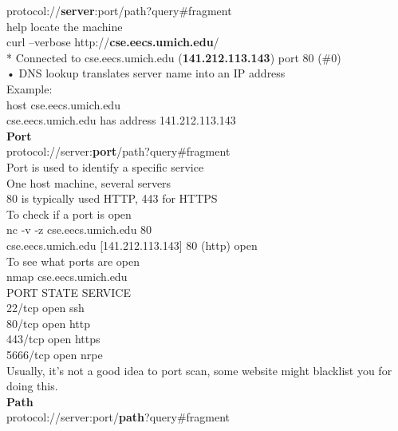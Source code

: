 \documentclass{article}
\begin{document}
protocol://\textbf{server}:port/path?query#fragment\\
help locate the machine\\
 curl --verbose http://\textbf{cse.eecs.umich.edu}/ \\
* Connected to cse.eecs.umich.edu (\textbf{141.212.113.143}) port 80 (\#0)\\
• DNS lookup translates server name into an IP address \\
Example: \\
host cse.eecs.umich.edu\\
cse.eecs.umich.edu has address 141.212.113.143 \\
\textbf{Port}\\
protocol://server:\textbf{port}/path?query#fragment\\
Port is used to identify a specific service\\
One host machine, several servers\\
80 is typically used HTTP, 443 for HTTPS\\
To check if a port is open\\
nc -v -z cse.eecs.umich.edu 80 \\
cse.eecs.umich.edu [141.212.113.143] 80 (http) open\\
To see what ports are open\\
nmap cse.eecs.umich.edu\\
PORT STATE SERVICE \\
22/tcp open ssh \\
80/tcp open http \\
443/tcp open https\\
5666/tcp open nrpe \\
Usually, it's not a good idea to port scan, some website might blacklist you for doing this.\\
\textbf{Path}\\
protocol://server:port/\textbf{path}?query#fragment\\
\end{document}
